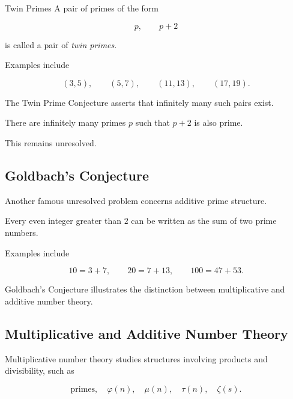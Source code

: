 \begin{definitionbox}{Twin Primes}
A pair of primes of the form

\[ p,\qquad p+2 \]

is called a pair of \emph{twin primes}.
\end{definitionbox}

Examples include

\[ (3,5),\qquad(5,7),\qquad(11,13),\qquad(17,19). \]

The Twin Prime Conjecture asserts that infinitely many such pairs exist.

\begin{conjecture}
There are infinitely many primes \(p\) such that \(p+2\) is also prime.
\end{conjecture}

This remains unresolved.

\subsection{Goldbach's Conjecture}
\label{subsec:goldbach-conjecture}

Another famous unresolved problem concerns additive prime structure.

\begin{conjecture}
Every even integer greater than \(2\) can be written as the sum of two prime
numbers.
\end{conjecture}

Examples include

\[ 10=3+7,\qquad20=7+13,\qquad100=47+53. \]

Goldbach's Conjecture illustrates the distinction between multiplicative and
additive number theory.

\subsection{Multiplicative and Additive Number Theory}
\label{subsec:multiplicative-additive-number-theory}

Multiplicative number theory studies structures involving products and
divisibility, such as

\[
\text{primes},\quad
\varphi(n),\quad
\mu(n),\quad
\tau(n),\quad
\zeta(s).
\]


